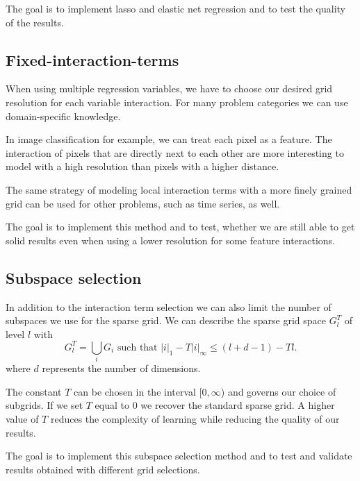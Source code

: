 \documentclass[11pt]{scrartcl}
\begin{document}
The goal is to implement lasso and elastic net regression and to test the quality of the results.
\subsection{Fixed-interaction-terms}
When using multiple regression variables, we have to choose our desired grid
resolution for each variable interaction.
For many problem categories we can use domain-specific knowledge. 

In image classification for example, we can treat each pixel as a feature.
The interaction of pixels that are directly next to each other are more
interesting to model with a high resolution than pixels with a higher distance.

The same strategy of modeling local interaction terms with a more finely
grained grid can be used for other problems, such as time series, as well.

The goal is to implement this method and to test,
whether we are still able to get solid results even when using a lower resolution for
some feature interactions.
\subsection{Subspace selection}
In addition to the interaction term selection we can also limit the number of
subspaces we use for the sparse grid. We can describe the sparse grid space
\(G^T_l\) of level \(l\) with
\begin{equation}
G^T_l = \bigcup_i G_i \text{ such that } \left\vert i \right\vert_1 - T \left\vert i \right\vert_\infty \leq (l + d - 1) - T l.
\end{equation}
where \(d\) represents the number of dimensions.
 
The constant \(T\) can be chosen in the interval \([0, \infty\)) and governs our
choice of subgrids. If we set \(T\) equal to \(0\) we recover the standard
sparse grid.
A higher value of \(T\) reduces the complexity of learning while reducing the
quality of our results.

The goal is to implement this subspace selection method and to test and
validate results obtained with different grid selections.
\end{document}
